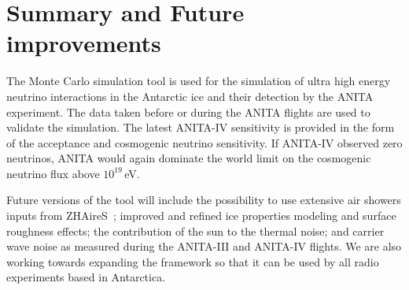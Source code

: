 \section{Summary and Future improvements}
\label{sec:future}
The \icemc Monte Carlo simulation tool is used for the
simulation of ultra high energy neutrino interactions in the Antarctic
ice and their detection by the ANITA experiment.
The data taken before or during the ANITA flights are used to validate the
simulation.
The latest ANITA-IV sensitivity is provided in the form of the
acceptance and cosmogenic neutrino sensitivity.
If ANITA-IV observed zero neutrinos, ANITA would again dominate the world limit on the cosmogenic neutrino flux above $10^{19}$\,eV.
 
Future versions of the tool will include the possibility to use extensive air showers inputs from ZHAireS~\cite{alvarez2012monte}; improved and refined ice properties modeling and surface roughness effects; the contribution of the sun to the thermal noise; and carrier wave noise as measured during the ANITA-III and ANITA-IV flights.
We are also working towards expanding the framework so that it can be used by all radio experiments based in Antarctica.
